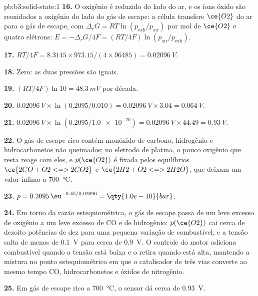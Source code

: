 \begin{solution}{pb:b3:solid-state:1}
\textbf{16.} O oxigênio é reduzido do lado do ar, e os íons óxido são reoxidados
a oxigênio do lado do gás de escape: a célula transfere $\ce{O2}$ do ar para o gás de escape, com
$\Delta_rG = RT\ln(p_{\mathrm{exh}}/p_{\mathrm{air}})$ por mol de $\ce{O2}$ e quatro elétrons: $E = -\Delta_rG/4F = (RT/4F)\ln(p_{\mathrm{air}}/p_{\mathrm{exh}})$.

\textbf{17.} $RT/4F = 8.3145 \times 973.15/(4 \times 96485) = \qty{0.02096}{V}$.

\textbf{18.} Zero: as duas pressões são iguais.

\textbf{19.} $(RT/4F)\ln 10 = \qty{48.3}{mV}$ por década.

\textbf{20.} $\qty{0.02096}{V} \times \ln(0.2095/0.010) = \qty{0.02096}{V} \times 3.04 = \qty{0.064}{V}$.

\textbf{21.} $\qty{0.02096}{V} \times \ln(0.2095/\num{1.0e-20}) = \qty{0.02096}{V} \times 44.49 = \qty{0.93}{V}$.

\textbf{22.} O gás de escape rico contém monóxido de carbono, hidrogênio e hidrocarbonetos
não queimados; no eletrodo de platina, o pouco oxigênio que resta reage com eles,
e $p(\ce{O2})$ é fixada pelos equilíbrios $\ce{2CO + O2 <=> 2CO2}$ e $\ce{2H2 + O2 <=> 2H2O}$, que deixam um valor
ínfimo a \qty{700}{\celsius}.

\textbf{23.} $p = 0.2095\,\eu^{-0.45/0.02096} = \qty{1.0e-10}{bar}$.

\textbf{24.} Em torno da razão estequiométrica, o gás de escape passa de um leve excesso
de oxigênio a um leve excesso de CO e de hidrogênio: $p(\ce{O2})$ cai cerca de dezoito
potências de dez para uma pequena variação de combustível, e a tensão salta de menos de
\qty{0.1}{V} para cerca de \qty{0.9}{V}. O controle do motor adiciona combustível quando a tensão está baixa e
o retira quando está alta, mantendo a mistura no ponto estequiométrico em que o
catalisador de três vias converte ao mesmo tempo CO, hidrocarbonetos e óxidos de nitrogênio.

\textbf{25.} Em gás de escape rico a \qty{700}{\celsius}, o sensor dá cerca de \qty{0.93}{V}.
\end{solution}
